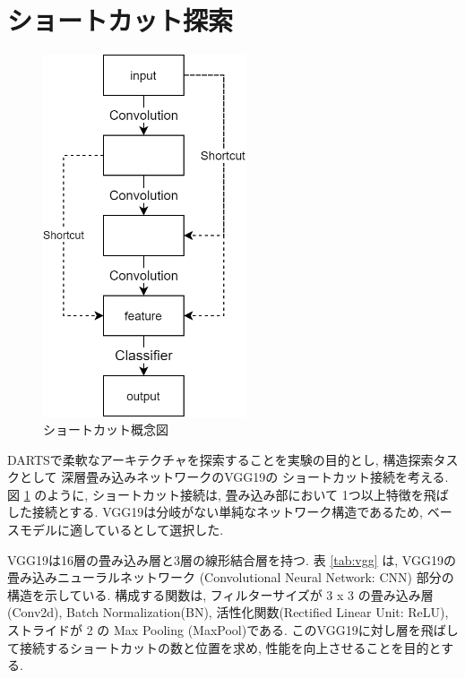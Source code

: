\newpage
\changeindent{0cm}
\section{ショートカット探索}
\label{sec:pred}
\changeindent{2cm}

\begin{figure}[t]
  \begin{center}
    \includegraphics[clip,width=6cm]{./fig/03.pred/image.png}
  \end{center}
  \caption{ショートカット概念図}
  \label{fig:image}
\end{figure}

DARTSで柔軟なアーキテクチャを探索することを実験の目的とし, 構造探索タスクとして
深層畳み込みネットワークのVGG19\cite{Simonyan15}の
ショートカット接続\cite{mao2016image}を考える.
図 \ref{fig:image} のように, ショートカット接続は,
畳み込み部において 1つ以上特徴を飛ばした接続とする.
VGG19は分岐がない単純なネットワーク構造であるため, ベースモデルに適しているとして選択した.

VGG19は16層の畳み込み層と3層の線形結合層を持つ.
表 \ref{tab:vgg} は, VGG19の畳み込みニューラルネットワーク
(Convolutional Neural Network: CNN) 部分の構造を示している.
構成する関数は, フィルターサイズが 3 x 3 の畳み込み層(Conv2d),
Batch Normalization(BN)\cite{Ioffe2015BatchNA},
活性化関数(Rectified Linear Unit: ReLU),
ストライドが 2 の Max Pooling (MaxPool)である.
このVGG19に対し層を飛ばして接続するショートカットの数と位置を求め,
性能を向上させることを目的とする.

